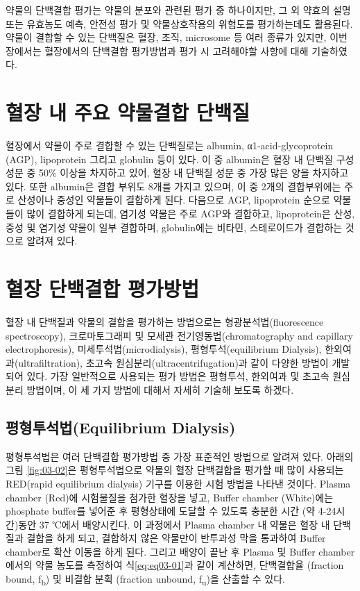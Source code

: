 \documentclass[
  11pt,
  krantz2, a4paper, twoside]{krantz}
\begin{document}
약물의 단백결합 평가는 약물의 분포와 관련된 평가 중 하나이지만, 그 외 약효의 설명 또는 유효농도 예측, 안전성 평가 및 약물상호작용의 위험도를 평가하는데도 활용된다. 약물이 결합할 수 있는 단백질은 혈장, 조직, microsome 등 여러 종류가 있지만, 이번 장에서는 혈장에서의 단백결합 평가방법과 평가 시 고려해야할 사항에 대해 기술하였다.

\section{혈장 내 주요 약물결합 단백질}\label{uxd608uxc7a5-uxb0b4-uxc8fcuxc694-uxc57duxbb3cuxacb0uxd569-uxb2e8uxbc31uxc9c8}

혈장에서 약물이 주로 결합할 수 있는 단백질로는 albumin,
α1-acid-glycoprotein (AGP), lipoprotein 그리고 globulin 등이 있다. 이 중
albumin은 혈장 내 단백질 구성 성분 중 50\% 이상을 차지하고 있어, 혈장 내
단백질 성분 중 가장 많은 양을 차지하고 있다. 또한 albumin은 결합 부위도
8개를 가지고 있으며, 이 중 2개의 결합부위에는 주로 산성이나 중성인
약물들이 결합하게 된다. 다음으로 AGP, lipoprotein 순으로 약물들이 많이
결합하게 되는데, 염기성 약물은 주로 AGP와 결합하고, lipoprotein은 산성,
중성 및 염기성 약물이 일부 결합하며, globulin에는 비타민, 스테로이드가
결합하는 것으로 알려져 있다.

\section{혈장 단백결합 평가방법}\label{uxd608uxc7a5-uxb2e8uxbc31uxacb0uxd569-uxd3c9uxac00uxbc29uxbc95}

혈장 내 단백질과 약물의 결합을 평가하는 방법으로는 형광분석법(fluorescence spectroscopy), 크로마토그래피 및 모세관 전기영동법(chromatography and capillary electrophoresis),
미세투석법(microdialysis), 평형투석(equilibrium Dialysis), 한외여과(ultrafiltration), 초고속 원심분리(ultracentrifugation)과 같이
다양한 방법이 개발되어 있다. 가장 일반적으로 사용되는 평가 방법은
평형투석, 한외여과 및 초고속 원심분리 방법이며, 이 세 가지 방법에 대해서
자세히 기술해 보도록 하겠다.

\subsection{평형투석법(Equilibrium Dialysis)}\label{uxd3c9uxd615uxd22cuxc11duxbc95equilibrium-dialysis}

평형투석법은 여러 단백결합 평가방법 중 가장 표준적인 방법으로 알려져 있다. 아래의 그림 \ref{fig:03-02}은 평형투석법으로 약물의 혈장
단백결합을 평가할 때 많이 사용되는 RED(rapid equilibrium dialysis) 기구를 이용한 시험 방법을 나타낸 것이다. Plasma chamber (Red)에
시험물질을 첨가한 혈장을 넣고, Buffer chamber (White)에는 phosphate
buffer를 넣어준 후 평형상태에 도달할 수 있도록 충분한 시간 (약
4-24시간)동안 37 ℃에서 배양시킨다. 이 과정에서 Plasma chamber 내 약물은
혈장 내 단백질과 결합을 하게 되고, 결합하지 않은 약물만이 반투과성 막을
통과하여 Buffer chamber로 확산 이동을 하게 된다. 그리고 배양이 끝난 후
Plasma 및 Buffer chamber에서의 약물 농도를 측정하여 식\eqref{eq:eq03-01}과 같이
계산하면, 단백결합율 (fraction bound, f\textsubscript{b}) 및 비결합 분획 (fraction
unbound, f\textsubscript{u})을 산출할 수 있다.
\end{document}
